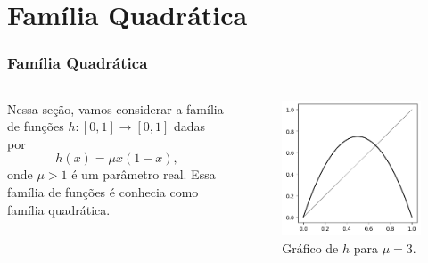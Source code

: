 \section{Família Quadrática}

\begin{frame}
\vspace{5pt}
\frametitle{Família Quadrática}
\begin{columns}
\column{0.55\dimexpr\paperwidth-15pt}

Nessa seção, vamos considerar a família de funções $h: [0, 1] \to [0, 1]$ dadas por
$$h(x) = \mu x(1-x),$$
onde $\mu > 1$ é um parâmetro real.
Essa família de funções é conhecia como família quadrática.

\column{0.35\dimexpr\paperwidth-15pt}

\begin{figure}[!htb]
\centering
\includegraphics[scale=0.5]{images/h_3.png}
\caption{Gráfico de $h$ para $\mu = 3$.}
\label{h_3,839}
\end{figure}

\end{columns}
\end{frame}

